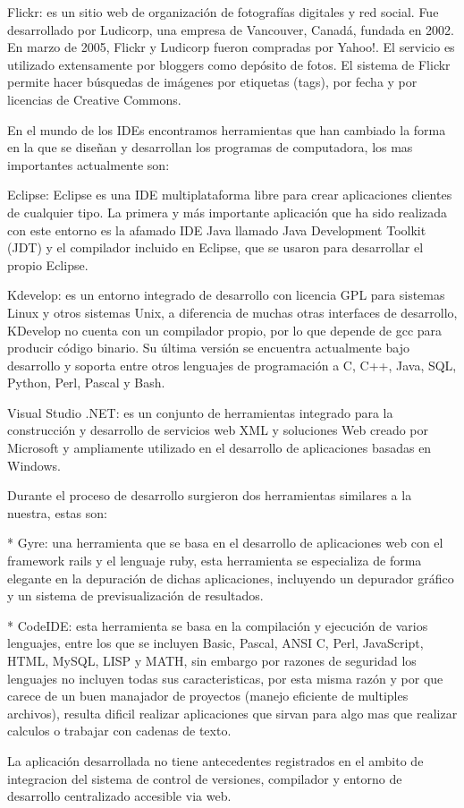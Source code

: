 Flickr: es un sitio web de organización de fotografías digitales y red social. Fue desarrollado por Ludicorp, una empresa de Vancouver, Canadá, fundada en 2002. En marzo de 2005, Flickr y Ludicorp fueron compradas por Yahoo!. El servicio es utilizado extensamente por bloggers como depósito de fotos. El sistema de Flickr permite hacer búsquedas de imágenes por etiquetas (tags), por fecha y por licencias de Creative Commons.

En el mundo de los IDEs encontramos herramientas que han cambiado la forma en la que se diseñan y desarrollan los programas de computadora, los mas importantes actualmente son:

Eclipse: Eclipse es una IDE multiplataforma libre para crear aplicaciones clientes de cualquier tipo. La primera y más importante aplicación que ha sido realizada con este entorno es la afamado IDE Java llamado Java Development Toolkit (JDT) y el compilador incluido en Eclipse, que se usaron para desarrollar el propio Eclipse.

Kdevelop: es un entorno integrado de desarrollo con licencia GPL para sistemas Linux y otros sistemas Unix, a diferencia de muchas otras interfaces de desarrollo, KDevelop no cuenta con un compilador propio, por lo que depende de gcc para producir código binario. Su última versión se encuentra actualmente bajo desarrollo y soporta entre otros lenguajes de programación a C, C++, Java, SQL, Python, Perl, Pascal y Bash.

Visual Studio .NET: es un conjunto de herramientas integrado para la construcción y desarrollo de servicios web XML y soluciones Web creado por Microsoft y ampliamente utilizado en el desarrollo de aplicaciones basadas en Windows.

Durante el proceso de desarrollo surgieron dos herramientas similares a la nuestra, estas son:

* Gyre: una herramienta que se basa en el desarrollo de aplicaciones web con el framework rails y el lenguaje ruby, esta herramienta se especializa de forma elegante en la depuración de dichas aplicaciones, incluyendo un depurador gráfico y un sistema de previsualización de resultados.

* CodeIDE: esta herramienta se basa en la compilación y ejecución de varios lenguajes, entre los que se incluyen Basic, Pascal, ANSI C, Perl, JavaScript, HTML, MySQL, LISP y MATH, sin embargo por razones de seguridad los lenguajes no incluyen todas sus caracteristicas, por esta misma razón y por que carece de un buen manajador de proyectos (manejo eficiente de multiples archivos), resulta dificil realizar aplicaciones que sirvan para algo mas que realizar calculos o trabajar con cadenas de texto.

La aplicación desarrollada no tiene antecedentes registrados en el ambito de integracion del sistema de control de versiones, compilador y entorno de desarrollo centralizado accesible via web.
